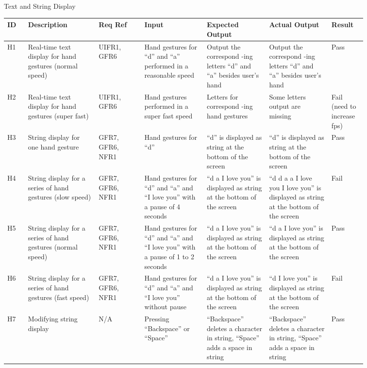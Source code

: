 \documentclass[12pt, titlepage]{article}
\begin{document}
\newpage
\centerline{Text and String Display}

\renewcommand{\arraystretch}{1.2}
\noindent \begin{longtable}{p{0.05\linewidth}|p{0.17\linewidth}|p{0.11\linewidth}|p{0.15\linewidth}|p{0.15\linewidth}|p{0.15\linewidth}|p{0.08\linewidth}}
\hline
\textbf{ID} & \textbf{Description} & \textbf{Req Ref} & \textbf{Input} & \textbf{Expected Output} & \textbf{Actual Output} & \textbf{Result}\\
\hline
H1 & Real-time text display for hand gestures (normal speed) & UIFR1, GFR6 & Hand gestures for “d” and “a” performed in a reasonable speed & Output the correspond -ing letters “d” and “a” besides user’s hand & Output the correspond -ing letters “d” and “a” besides user’s hand & Pass\\ \hline
H2 & Real-time text display for hand gestures (super fast) & UIFR1, GFR6 & Hand gestures performed in a super fast speed & Letters for correspond -ing hand gestures & Some letters output are missing & Fail (need to increase fps)\\ \hline
H3 & String display for one hand gesture & GFR7, GFR6, NFR1 & Hand gestures for “d” & “d” is displayed as string at the bottom of the screen & “d” is displayed as string at the bottom of the screen & Pass\\ \hline
H4 & String display for a series of hand gestures (slow speed) & GFR7, GFR6, NFR1 & Hand gestures for “d” and “a” and “I love you” with a pause of 4 seconds & “d a I love you” is displayed as string at the bottom of the screen & “d d a a I love you I love you” is displayed as string at the bottom of the screen & Fail\\ \hline
H5 & String display for a series of hand gestures (normal speed) & GFR7, GFR6, NFR1 & Hand gestures for “d” and “a” and “I love you” with a pause of 1 to 2 seconds & “d a I love you” is displayed as string at the bottom of the screen & “d a I love you” is displayed as string at the bottom of the screen
& Pass\\ \hline
H6 & String display for a series of hand gestures (fast speed) & GFR7, GFR6, NFR1 & Hand gestures for “d” and “a” and “I love you” without pause & “d a I love you” is displayed as string at the bottom of the screen & “d I love you” is displayed as string at the bottom of the screen & Fail\\ \hline
H7 & Modifying string display & N/A & Pressing “Backspace” or “Space” & “Backspace” deletes a character in string, “Space” adds a space in string & “Backspace” deletes a character in string, “Space” adds a space in string & Pass\\ \hline

\end{longtable}
\end{document}
